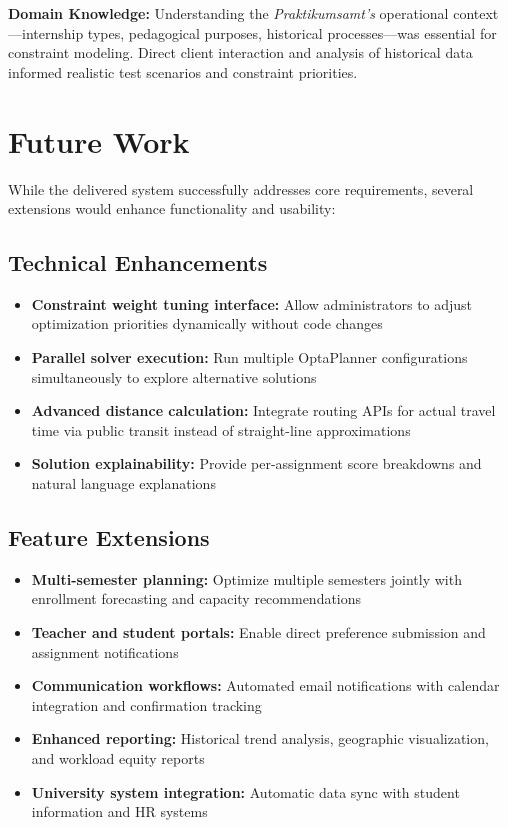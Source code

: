 \documentclass[12pt,a4paper]{report}
\begin{document}
\textbf{Domain Knowledge:} Understanding the \textit{Praktikumsamt's} operational context—internship types, pedagogical purposes, historical processes—was essential for constraint modeling. Direct client interaction and analysis of historical data informed realistic test scenarios and constraint priorities.

\section{Future Work}

While the delivered system successfully addresses core requirements, several extensions would enhance functionality and usability:

\subsection{Technical Enhancements}

\begin{itemize}
    \item \textbf{Constraint weight tuning interface:} Allow administrators to adjust optimization priorities dynamically without code changes
    
    \item \textbf{Parallel solver execution:} Run multiple OptaPlanner configurations simultaneously to explore alternative solutions
    
    \item \textbf{Advanced distance calculation:} Integrate routing APIs for actual travel time via public transit instead of straight-line approximations
    
    \item \textbf{Solution explainability:} Provide per-assignment score breakdowns and natural language explanations
\end{itemize}

\subsection{Feature Extensions}

\begin{itemize}
    \item \textbf{Multi-semester planning:} Optimize multiple semesters jointly with enrollment forecasting and capacity recommendations
    
    \item \textbf{Teacher and student portals:} Enable direct preference submission and assignment notifications
    
    \item \textbf{Communication workflows:} Automated email notifications with calendar integration and confirmation tracking
    
    \item \textbf{Enhanced reporting:} Historical trend analysis, geographic visualization, and workload equity reports
    
    \item \textbf{University system integration:} Automatic data sync with student information and HR systems
\end{itemize}
\end{document}
